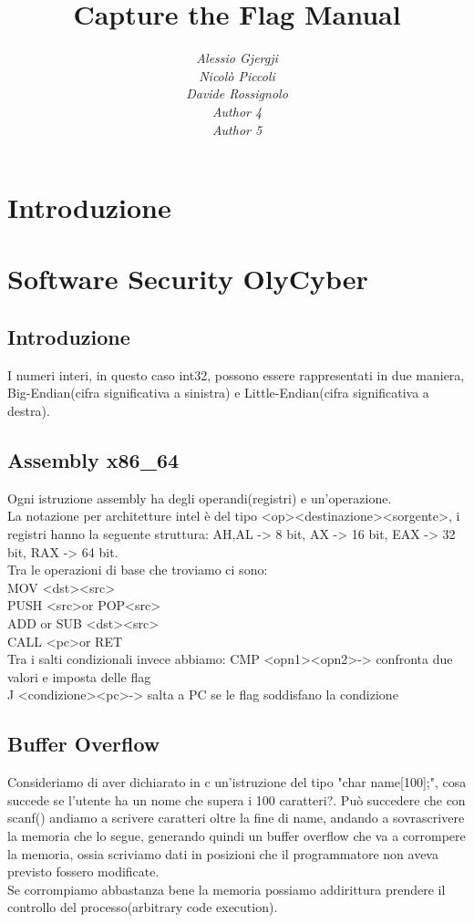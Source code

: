\documentclass[oneside,a4paper,11pt]{book}
\title{Capture the Flag Manual}
\author{
\textit{Alessio Gjergji}\\
\textit{Nicolò Piccoli} \\
\textit{Davide Rossignolo} \\
\textit{Author 4} \\
\textit{Author 5}}
\date{}
\theoremstyle{italicstyle}
\theoremstyle{normStyle}
\begin{document}
\maketitle
\tableofcontents
\chapter{Introduzione}

\chapter{Software Security OlyCyber}
\section{Introduzione}
I numeri interi, in questo caso int32, possono essere rappresentati in due maniera, Big-Endian(cifra significativa a sinistra) e Little-Endian(cifra significativa a destra).
\section{Assembly x86\_64}
Ogni istruzione assembly ha degli operandi(registri) e un'operazione.\\
La notazione per architetture intel è del tipo \textless op\textgreater\textless destinazione\textgreater\textless sorgente\textgreater, i registri hanno la seguente struttura:
AH,AL -> 8 bit, AX -> 16 bit, EAX -> 32 bit, RAX -> 64 bit.\\
Tra le operazioni di base che troviamo ci sono: \\
MOV \textless dst\textgreater\textless src\textgreater\\
PUSH \textless src\textgreater or POP\textless src\textgreater\\
ADD or SUB \textless dst\textgreater\textless src\textgreater\\
CALL \textless pc\textgreater or RET\\
Tra i salti condizionali invece abbiamo:
CMP \textless opn1\textgreater\textless opn2\textgreater -> confronta due valori e imposta delle flag\\
J \textless condizione\textgreater\textless pc\textgreater -> salta a PC se le flag soddisfano la condizione\\
\section{Buffer Overflow}
Consideriamo di aver dichiarato in c un'istruzione del tipo "char name[100];", cosa succede se l'utente ha un nome che supera i 100 caratteri?.
Può succedere che con scanf() andiamo a scrivere caratteri oltre la fine di name, andando a sovrascrivere la memoria che lo segue, generando quindi un buffer overflow che va a corrompere la memoria, ossia scriviamo dati in posizioni che il programmatore non aveva previsto fossero modificate.\\
Se corrompiamo abbastanza bene la memoria possiamo addirittura prendere il controllo del processo(arbitrary code execution).
\end{document}
